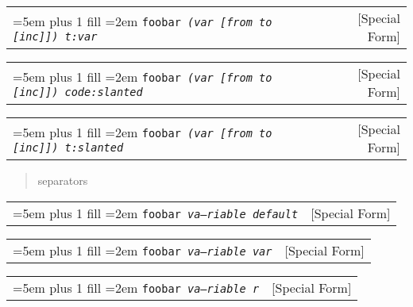 \documentclass{book}
\newcommand\GNUTexinfocommandstyletextvar[1]{{\normalfont{}\textsl{#1}}}%
\begin{document}
%

\noindent\begin{tabularx}{\linewidth}{@{}Xr}
\rightskip=5em plus 1 fill
\hangindent=2em
\texttt{foobar \EmbracOn{}\textnormal{\textsl{(var \texttt{\GNUTexinfocommandstyletextvar{[}}from to \texttt{\GNUTexinfocommandstyletextvar{[}}inc\texttt{\GNUTexinfocommandstyletextvar{]]}}) t:var}}\EmbracOff{}}& [Special Form]
\end{tabularx}

%

\noindent\begin{tabularx}{\linewidth}{@{}Xr}
\rightskip=5em plus 1 fill
\hangindent=2em
\texttt{foobar \EmbracOn{}\textnormal{\textsl{(var \texttt{\textsl{[}}from to \texttt{\textsl{[}}inc\texttt{\textsl{]]}}) code:slanted}}\EmbracOff{}}& [Special Form]
\end{tabularx}

%

\noindent\begin{tabularx}{\linewidth}{@{}Xr}
\rightskip=5em plus 1 fill
\hangindent=2em
\texttt{foobar \EmbracOn{}\textnormal{\textsl{(var \texttt{\textsl{[}}from to \texttt{\textsl{[}}inc\texttt{\textsl{]]}}) t:slanted}}\EmbracOff{}}& [Special Form]
\end{tabularx}

%
\begin{quote}
\unskip{\parskip=0pt\noindent}%
separators
\end{quote}


\noindent\begin{tabularx}{\linewidth}{@{}Xr}
\rightskip=5em plus 1 fill
\hangindent=2em
\texttt{foobar \EmbracOn{}\textnormal{\textsl{va---riable default}}\EmbracOff{}}& [Special Form]
\end{tabularx}

%

\noindent\begin{tabularx}{\linewidth}{@{}Xr}
\rightskip=5em plus 1 fill
\hangindent=2em
\texttt{foobar \EmbracOn{}\textnormal{\textsl{\GNUTexinfocommandstyletextvar{va---riable} var}}\EmbracOff{}}& [Special Form]
\end{tabularx}

%

\noindent\begin{tabularx}{\linewidth}{@{}Xr}
\rightskip=5em plus 1 fill
\hangindent=2em
\texttt{foobar \EmbracOn{}\textnormal{\textsl{\EmbracOff{}\textnormal{va---riable}\EmbracOn{} r}}\EmbracOff{}}& [Special Form]
\end{tabularx}
\end{document}
